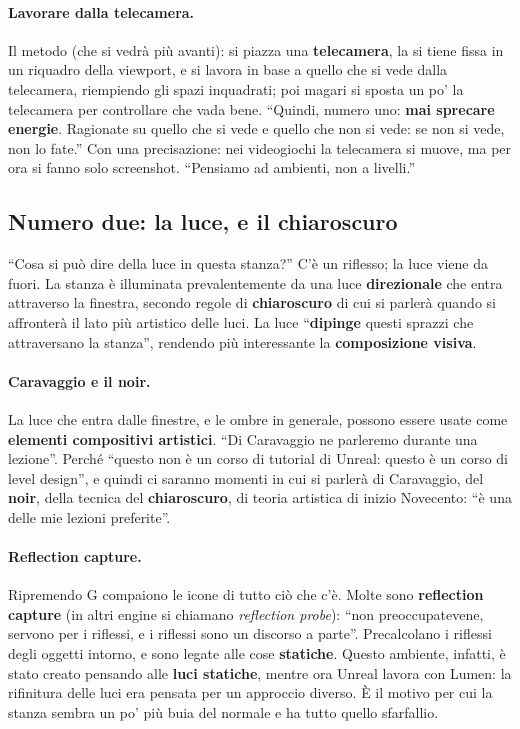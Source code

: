 \paragraph{Lavorare dalla telecamera.} Il metodo (che si vedrà più avanti): si piazza
una \textbf{telecamera}, la si tiene fissa in un riquadro della viewport, e si
lavora in base a quello che si vede dalla telecamera, riempiendo gli spazi
inquadrati; poi magari si sposta un po' la telecamera per controllare che vada
bene. ``Quindi, numero uno: \textbf{mai sprecare energie}. Ragionate su quello che si
vede e quello che non si vede: se non si vede, non lo fate.'' Con una precisazione:
nei videogiochi la telecamera si muove, ma per ora si fanno solo screenshot.
``Pensiamo ad ambienti, non a livelli.''

\subsection{Numero due: la luce, e il chiaroscuro}

``Cosa si può dire della luce in questa stanza?'' C'è un riflesso; la luce viene da
fuori. La stanza è illuminata prevalentemente da una luce \textbf{direzionale} che
entra attraverso la finestra, secondo regole di \textbf{chiaroscuro} di cui si
parlerà quando si affronterà il lato più artistico delle luci. La luce
``\textbf{dipinge} questi sprazzi che attraversano la stanza'', rendendo più
interessante la \textbf{composizione visiva}.

\paragraph{Caravaggio e il noir.} La luce che entra dalle finestre, e le ombre in
generale, possono essere usate come \textbf{elementi compositivi artistici}.
``Di Caravaggio ne parleremo durante una lezione''. Perché
``questo non è un corso di tutorial di Unreal: questo è un corso di level design'',
e quindi ci saranno momenti in cui si parlerà di Caravaggio, del
\textbf{noir}, della tecnica del \textbf{chiaroscuro}, di teoria artistica di inizio
Novecento: ``è una delle mie lezioni preferite''.

\paragraph{Reflection capture.} Ripremendo G compaiono le icone di tutto ciò che c'è.
Molte sono \textbf{reflection capture} (in altri engine si chiamano
\emph{reflection probe}): ``non preoccupatevene, servono per i riflessi, e i riflessi
sono un discorso a parte''. Precalcolano i riflessi degli oggetti intorno, e sono
legate alle cose \textbf{statiche}. Questo ambiente, infatti, è stato creato pensando
alle \textbf{luci statiche}, mentre ora Unreal lavora con Lumen: la rifinitura delle
luci era pensata per un approccio diverso. È il motivo per cui la stanza sembra un
po' più buia del normale e ha tutto quello sfarfallio.

